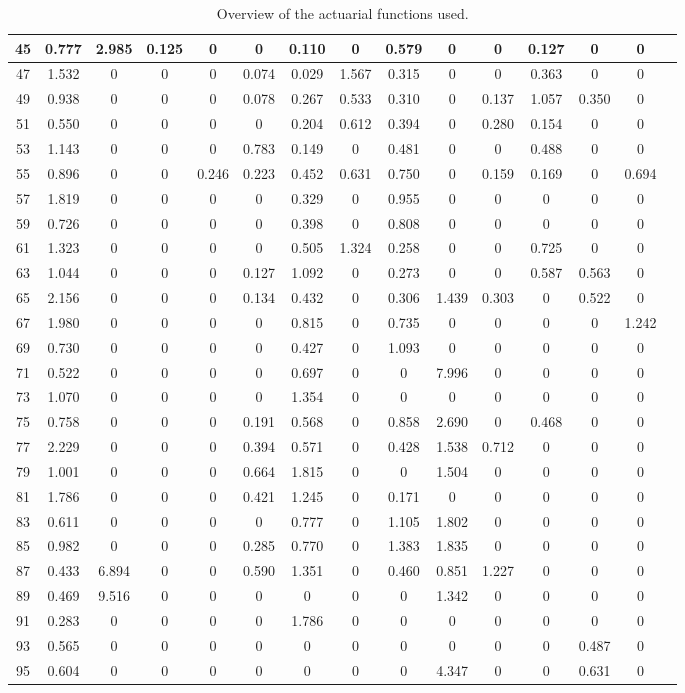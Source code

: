 \begin{table*}[htb]
\begin{tabular}{|c |c |c |c |c |c |c |c |c |c |c |c |c |c |c|}
45&0.777& 2.985& 0.125& 0& 0& 0.110& 0& 0.579& 0& 0& 0.127& 0& 0\\\hline
47&1.532& 0& 0& 0& 0.074& 0.029& 1.567& 0.315& 0& 0& 0.363& 0& 0\\\hline
49&0.938& 0& 0& 0& 0.078& 0.267& 0.533& 0.310& 0& 0.137& 1.057& 0.350& 0\\\hline
51&0.550& 0& 0& 0& 0& 0.204& 0.612& 0.394& 0& 0.280& 0.154& 0& 0\\\hline
53&1.143& 0& 0& 0& 0.783& 0.149& 0& 0.481& 0& 0& 0.488& 0& 0\\\hline
55&0.896& 0& 0& 0.246& 0.223& 0.452& 0.631& 0.750& 0& 0.159& 0.169& 0& 0.694\\\hline
57&1.819& 0& 0& 0& 0& 0.329& 0& 0.955& 0& 0& 0& 0& 0\\\hline
59&0.726& 0& 0& 0& 0& 0.398& 0& 0.808& 0& 0& 0& 0& 0\\\hline
61&1.323& 0& 0& 0& 0& 0.505& 1.324& 0.258& 0& 0& 0.725& 0& 0\\\hline
63&1.044& 0& 0& 0& 0.127& 1.092& 0& 0.273& 0& 0& 0.587& 0.563& 0\\\hline
65&2.156& 0& 0& 0& 0.134& 0.432& 0& 0.306& 1.439& 0.303& 0& 0.522& 0\\\hline
67&1.980& 0& 0& 0& 0& 0.815& 0& 0.735& 0& 0& 0& 0& 1.242\\\hline
69&0.730& 0& 0& 0& 0& 0.427& 0& 1.093& 0& 0& 0& 0& 0\\\hline
71&0.522& 0& 0& 0& 0& 0.697& 0& 0& 7.996& 0& 0& 0& 0\\\hline
73&1.070& 0& 0& 0& 0& 1.354& 0& 0& 0& 0& 0& 0& 0\\\hline
75&0.758& 0& 0& 0& 0.191& 0.568& 0& 0.858& 2.690& 0& 0.468& 0& 0\\\hline
77&2.229& 0& 0& 0& 0.394& 0.571& 0& 0.428& 1.538& 0.712& 0& 0& 0\\\hline
79&1.001& 0& 0& 0& 0.664& 1.815& 0& 0& 1.504& 0& 0& 0& 0\\\hline
81&1.786& 0& 0& 0& 0.421& 1.245& 0& 0.171& 0& 0& 0& 0& 0\\\hline
83&0.611& 0& 0& 0& 0& 0.777& 0& 1.105& 1.802& 0& 0& 0& 0\\\hline
85&0.982& 0& 0& 0& 0.285& 0.770& 0& 1.383& 1.835& 0& 0& 0& 0\\\hline
87&0.433& 6.894& 0& 0& 0.590& 1.351& 0& 0.460& 0.851& 1.227& 0& 0& 0\\\hline
89&0.469& 9.516& 0& 0& 0& 0& 0& 0& 1.342& 0& 0& 0& 0\\\hline
91&0.283& 0& 0& 0& 0& 1.786& 0& 0& 0& 0& 0& 0& 0\\\hline
93&0.565& 0& 0& 0& 0& 0& 0& 0& 0& 0& 0& 0.487& 0\\\hline
95&0.604& 0& 0& 0& 0& 0& 0& 0& 4.347& 0& 0& 0.631& 0\\\hline

    \end{tabular}
    \caption{Overview of the actuarial functions used.}
    \label{table:probabilityItems}
\end{table*}
    